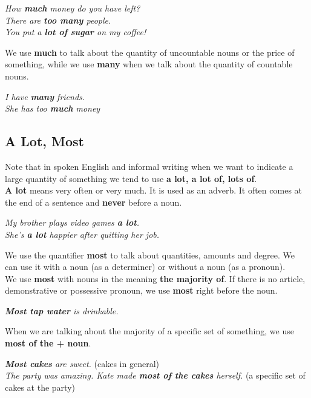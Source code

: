 \documentclass[hidelinks,10pt,a4paper]{article}
\begin{document}
\begin{center}
	\textit{How \textbf{much} money do you have left? \\
	There are \textbf{too many} people. \\
	You put a \textbf{lot of sugar} on my coffee! }
\end{center}

We use \textbf{much} to talk about the quantity of uncountable nouns or the price of something, while we use \textbf{many} when we talk about the quantity of countable nouns.
\begin{center}
	\textit{I have \textbf{many} friends. \\
	She has too \textbf{much}  money }
\end{center}

\subsection{A Lot, Most}
Note that in spoken English and informal writing when we want to indicate a large quantity of something we tend to use \textbf{ a lot, a lot of, lots of}.\\

\textbf{A lot} means very often or very much. It is used as an adverb. It often comes at the end of a sentence and \textbf{never} before a noun.

\begin{center}
	\textit{My brother plays video games \textbf{a lot}. \\
	She's \textbf{a lot} happier after quitting her job. }
\end{center}

We use the quantifier \textbf{most} to talk about quantities, amounts and degree. We can use it with a noun (as a determiner) or without a noun (as a pronoun). \\
\newpage
We use \textbf{most} with nouns in the meaning \textbf{the majority of}. If there is no article, demonstrative or possessive pronoun, we use \textbf{most} right before the noun.
 \begin{center}
 	\textit{ \textbf{Most tap water} is drinkable. }
 \end{center}

When we are talking about the majority of a specific set of something, we use \textbf{most of the + noun}.

\begin{center}
	\textit{ \textbf{Most cakes} are sweet. } (cakes in general) \\
	\textit{ The party was amazing. Kate made \textbf{most of the cakes} herself. } (a specific set of cakes at the party)
\end{center}
\end{document}
